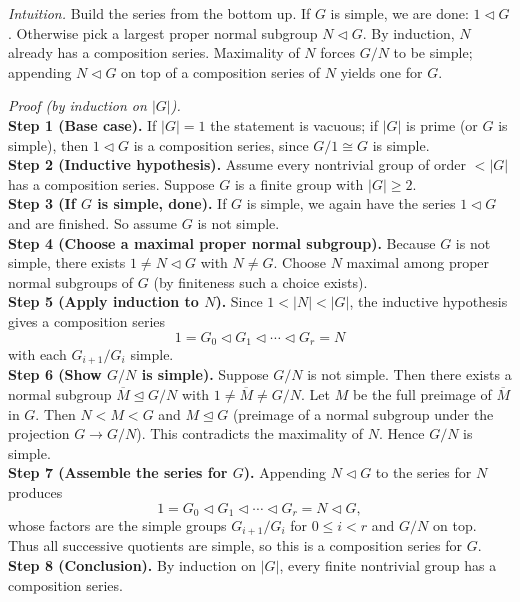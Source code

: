 \documentclass[12pt]{article}
\theoremstyle{definition}
\begin{document}
\newpage

\dotfill

\emph{Intuition.} Build the series from the bottom up. If $G$ is simple, we are done: $1\lhd G$. Otherwise pick a largest proper normal subgroup $N\lhd G$. By induction, $N$ already has a composition series. Maximality of $N$ forces $G/N$ to be simple; appending $N\lhd G$ on top of a composition series of $N$ yields one for $G$.\\

\dotfill

\emph{Proof (by induction on $|G|$).}\\
\textbf{Step 1 (Base case).} If $|G|=1$ the statement is vacuous; if $|G|$ is prime (or $G$ is simple), then $1\lhd G$ is a composition series, since $G/1\cong G$ is simple.\\
\textbf{Step 2 (Inductive hypothesis).} Assume every nontrivial group of order $<|G|$ has a composition series. Suppose $G$ is a finite group with $|G|\ge 2$.\\
\textbf{Step 3 (If $G$ is simple, done).} If $G$ is simple, we again have the series $1\lhd G$ and are finished. So assume $G$ is not simple.\\
\textbf{Step 4 (Choose a maximal proper normal subgroup).} Because $G$ is not simple, there exists $1\neq N\lhd G$ with $N\ne G$. Choose $N$ maximal among proper normal subgroups of $G$ (by finiteness such a choice exists).\\
\textbf{Step 5 (Apply induction to $N$).} Since $1<|N|<|G|$, the inductive hypothesis gives a composition series
\[
1=G_0 \lhd G_1 \lhd \cdots \lhd G_r=N
\]
with each $G_{i+1}/G_i$ simple.\\
\textbf{Step 6 (Show $G/N$ is simple).} Suppose $G/N$ is not simple. Then there exists a normal subgroup $\overline{M}\trianglelefteq G/N$ with $1\ne \overline{M}\ne G/N$. Let $M$ be the full preimage of $\overline{M}$ in $G$. Then $N<M<G$ and $M\trianglelefteq G$ (preimage of a normal subgroup under the projection $G\to G/N$). This contradicts the maximality of $N$. Hence $G/N$ is simple.\\
\textbf{Step 7 (Assemble the series for $G$).} Appending $N\lhd G$ to the series for $N$ produces
\[
1=G_0 \lhd G_1 \lhd \cdots \lhd G_r=N \lhd G,
\]
whose factors are the simple groups $G_{i+1}/G_i$ for $0\le i<r$ and $G/N$ on top. Thus all successive quotients are simple, so this is a composition series for $G$.\\
\textbf{Step 8 (Conclusion).} By induction on $|G|$, every finite nontrivial group has a composition series.\\
\end{document}
